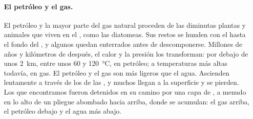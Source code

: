 \paragraph{El petróleo y el gas.} El petróleo y la mayor parte del gas
natural proceden de las diminutas plantas y animales que viven en el ,
como las diatomeas. Sus restos se hunden con el  hasta el fondo del
, y algunos quedan enterrados antes de descomponerse. Millones de años
y kilómetros de  después, el calor y la presión los transforman:
por debajo de unos \qty{2}{km}, entre unos 60 y \qty{120}{\degreeCelsius},
en petróleo; a temperaturas más altas todavía, en gas. El petróleo y el
gas son más ligeros que el agua. Ascienden lentamente a través de los
 de las  , y muchos llegan a la superficie y se
pierden. Los que encontramos fueron detenidos en su camino por una capa de
 , a menudo en lo alto de un pliegue abombado hacia arriba,
donde se acumulan: el gas arriba, el petróleo debajo y el agua más abajo.

